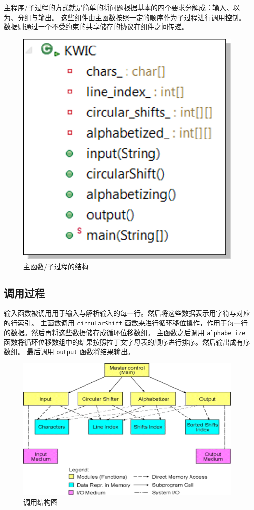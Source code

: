 \documentclass{ctexart}
\begin{document}
主程序/子过程的方式就是简单的将问题根据基本的四个要求分解成：输入、以为、分组与输出。
这些组件由主函数按照一定的顺序作为子过程进行调用控制。
数据则通过一个不受约束的共享储存的协议在组件之间传递。
\begin{figure}[h!]
\centering
\includegraphics[width=0.7\linewidth]{homework1-shared_data}
\caption{主函数/子过程的结构}
\label{fig:homework1-shared_data}
\end{figure}
\subsection{调用过程}

输入函数被调用用于输入与解析输入的每一行。然后将这些数据表示用字符与对应的行索引。
主函数调用 \lstinline|circularShift| 函数来进行循环移位操作，作用于每一行的数据。然后再将这些数据储存成循环位移数组。
主函数之后调用 \lstinline|alphabetize| 函数将循环位移数组中的结果按照拉丁文字母表的顺序进行排序。然后输出成有序数组。
最后调用 \lstinline|output| 函数将结果输出。

\begin{figure}[h!]
    \centering
    \includegraphics[width=0.7\linewidth]{homework1-shared_data2}
    \caption{调用结构图}
    \label{fig:homework1-shared_data2}
\end{figure}
\end{document}
